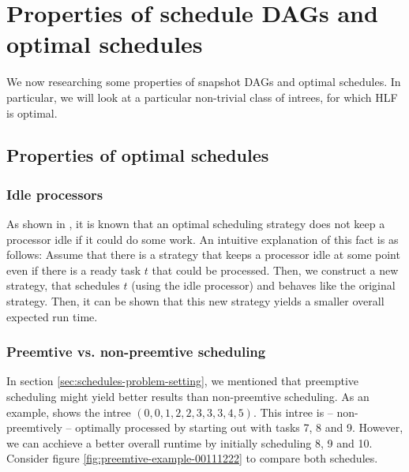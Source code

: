 \chapter{Properties of schedule DAGs and optimal schedules}
\label{chap:p3}

We now researching some properties of snapshot DAGs and optimal schedules. In particular, we will look at a particular non-trivial class of intrees, for which HLF is optimal.

\section{Properties of optimal schedules}
\label{sec:optimal-schedules-properties}

\subsection{Idle processors}
\label{sec:optimal-schedule-no-idleness}

As shown in \cite{chandyreynoldslargepaper1979}, it is known that an optimal scheduling strategy does not keep a processor idle if it could do some work. An intuitive explanation of this fact is as follows: Assume that there is a strategy that keeps a processor idle at some point even if there is a ready task $t$ that could be processed. Then, we construct a new strategy, that schedules $t$ (using the idle processor) and behaves like the original strategy. Then, it can be shown that this new strategy yields a smaller overall expected run time.

\subsection{Preemtive vs. non-preemtive scheduling}
\label{sec:optimal-schedules-preemtive}

\label{preemtiveness-explanation}
In section \ref{sec:schedules-problem-setting}, we mentioned that preemptive scheduling might yield better results than non-preemtive scheduling. As an example, \cite{MoritzMaasDiploma} shows the intree $(0,0,1,2,2,3,3,3,4,5)$. This intree is -- non-preemtively -- optimally processed by starting out with tasks 7, 8 and 9. However, we can acchieve a better overall runtime by initially scheduling 8, 9 and 10. Consider figure \ref{fig:preemtive-example-00111222} to compare both schedules.

